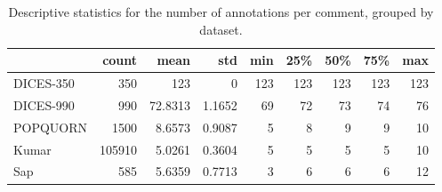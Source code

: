 \begin{table}[t]
	\centering
	\caption{Descriptive statistics for the number of annotations per comment, grouped by dataset.}
	\label{tab:num-annot}
	\begin{tabular}{lrrrrrrrr}
		\toprule
		& count & mean & std & min & 25\% & 50\% & 75\% & max \\
		\midrule
		DICES-350 & 350 & 123 & 0 & 123 & 123 & 123 & 123 & 123 \\
		DICES-990 & 990 & 72.8313 & 1.1652 & 69 & 72 & 73 & 74 & 76 \\
		POPQUORN & 1500 & 8.6573 & 0.9087 & 5 & 8 & 9 & 9 & 10 \\
		Kumar & 105910 & 5.0261 & 0.3604 & 5 & 5 & 5 & 5 & 10 \\
		Sap & 585 & 5.6359 & 0.7713 & 3 & 6 & 6 & 6 & 12 \\
		\bottomrule
	\end{tabular}
\end{table}
